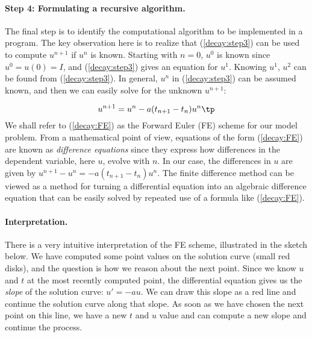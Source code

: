 \documentclass[graybox,sectrefs,envcountresetchap,open=right,final]{svmonodo}
\begin{document}

\paragraph{Step 4: Formulating a recursive algorithm.}
The final step is to identify the computational algorithm to be implemented
in a program. The key observation here is to realize that
(\ref{decay:step3}) can be used to compute $u^{n+1}$ if $u^n$ is known.
Starting with $n=0$, $u^0$ is known since $u^0=u(0)=I$, and
(\ref{decay:step3}) gives an equation for $u^1$. Knowing $u^1$,
$u^2$ can be found from (\ref{decay:step3}). In general, $u^n$
in (\ref{decay:step3}) can be assumed known, and then we can easily solve for
the unknown $u^{n+1}$:

\begin{equation}
u^{n+1} = u^n - a(t_{n+1} -t_n)u^n\tp
\label{decay:FE}
\end{equation}
We shall refer to (\ref{decay:FE}) as the Forward Euler (FE) scheme
for our model problem. From a mathematical point of view,
equations of the form (\ref{decay:FE}) are known as
\emph{difference equations} since they express how differences in
the dependent variable, here $u$, evolve with $n$. In our case,
the differences in $u$ are given by $u^{n+1}-u^n = -a(t_{n+1}-t_n)u^n$.
The finite difference method can be viewed as a method for turning
a differential equation into an algebraic difference equation that
can be easily solved by repeated use of a formula like (\ref{decay:FE}).

\paragraph{Interpretation.}
There is a very intuitive interpretation of the FE scheme, illustrated
in the sketch below. We have computed some point values
on the solution curve (small red disks), and the question is how we reason
about the next point. Since we know $u$ and $t$ at the most recently
computed point, the differential equation gives us the \emph{slope} of
the solution curve: $u'=-au$. We can draw this slope as a red line
and continue the solution curve along that slope. As soon as we have
chosen the next point on this line, we have a new $t$ and $u$ value and
can compute a new slope and continue the process.
\end{document}
